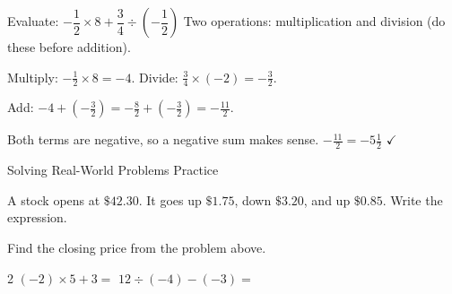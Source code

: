 \begin{stepExample}{Evaluate: $-\dfrac{1}{2} \times 8 + \dfrac{3}{4} \div \left(-\dfrac{1}{2}\right)$}
     Two operations: multiplication and division (do these before addition).

     Multiply: $-\frac{1}{2} \times 8 = -4$. \quad Divide: $\frac{3}{4} \times (-2) = -\frac{3}{2}$.\par
    Add: $-4 + \left(-\frac{3}{2}\right) = -\frac{8}{2} + \left(-\frac{3}{2}\right) = -\frac{11}{2}$.

     Both terms are negative, so a negative sum makes sense. $-\frac{11}{2} = -5\frac{1}{2}$ $\checkmark$
\end{stepExample}


\newpage
\begin{stepPractice}{Solving Real-World Problems Practice}
    \resetProblems

    \prob A stock opens at $\$42.30$. It goes up $\$1.75$, down $\$3.20$, and up $\$0.85$. Write the expression. \answerBlank[4cm]

    \prob Find the closing price from the problem above. \answerBlank[2cm]

    \begin{multicols}{2}
    \prob $(-2) \times 5 + 3 =$ \answerBlank[2cm]
    \prob $12 \div (-4) - (-3) =$ \answerBlank[2cm]
    \end{multicols}


\end{stepPractice}
